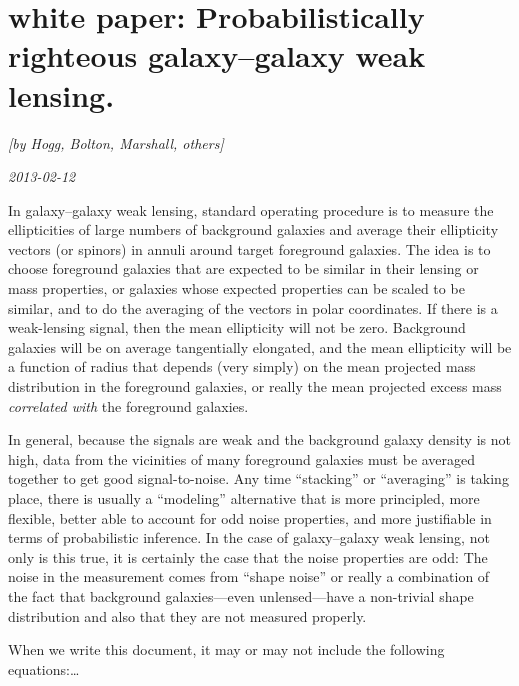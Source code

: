\documentclass[12pt, pdftex]{article}
\begin{document}
\section*{white paper: Probabilistically righteous galaxy--galaxy weak lensing.}

\noindent
\textsl{[by Hogg, Bolton, Marshall, others]}

\noindent
\textsl{2013-02-12}

In galaxy--galaxy weak lensing, standard operating procedure is to
measure the ellipticities of large numbers of background galaxies and
average their ellipticity vectors (or spinors) in annuli around target
foreground galaxies.  The idea is to choose foreground galaxies that
are expected to be similar in their lensing or mass properties, or
galaxies whose expected properties can be scaled to be similar, and to
do the averaging of the vectors in polar coordinates.  If there is a
weak-lensing signal, then the mean ellipticity will not be zero.
Background galaxies will be on average tangentially elongated, and the
mean ellipticity will be a function of radius that depends (very
simply) on the mean projected mass distribution in the foreground
galaxies, or really the mean projected excess mass \emph{correlated
  with} the foreground galaxies.

In general, because the signals are weak and the background galaxy
density is not high, data from the vicinities of many foreground
galaxies must be averaged together to get good signal-to-noise.  Any
time ``stacking'' or ``averaging'' is taking place, there is usually a
``modeling'' alternative that is more principled, more flexible,
better able to account for odd noise properties, and more justifiable
in terms of probabilistic inference.  In the case of galaxy--galaxy
weak lensing, not only is this true, it is certainly the case that the
noise properties are odd: The noise in the measurement comes from
``shape noise'' or really a combination of the fact that background
galaxies---even unlensed---have a non-trivial shape distribution and
also that they are not measured properly.

When we write this document, it may or may not include the following
equations:\ldots
\end{document}
